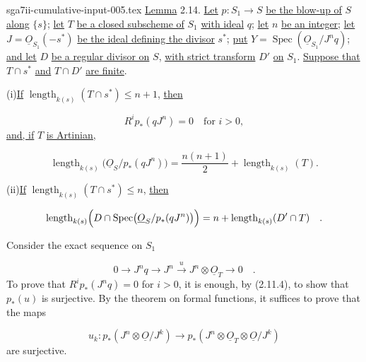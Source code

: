 \begin{filecontents*}{sga7ii-cumulative-input-005.tex}
\underline{Lemma} 2.14. \underline{Let} $p:S_1\longrightarrow S$
\underline{be the blow-up of} $S$ \underline{along} $\{s\}$; \underline{let}
$T$ \underline{be a closed subscheme of} $S_1$ \underline{with ideal} $q$;
\underline{let} $n$ \underline{be an integer}; \underline{let}
$J=\underline{O}_{S_1}(-s^*)$ \underline{be the ideal defining the divisor}
$s^*$; \underline{put}
$Y=\operatorname{Spec}(\underline{O}_{S_1}/J^nq)$; \underline{and let} $D$
\underline{be a regular divisor on} $S$, \underline{with strict transform} $D'$
\underline{on} $S_1$. \underline{Suppose that} $T\cap s^*$ \underline{and}
$T\cap D'$ \underline{are finite}.

(i)\quad \underline{If}
$\operatorname{length}_{k(s)}(T\cap s^*)\leq n+1$, \underline{then}

\begin{equation*}
R^ip_*(qJ^n)=0\quad\text{for }i>0,
\end{equation*}
\underline{and, if} $T$ \underline{is Artinian,}

\begin{equation*}
\operatorname{length}_{k(s)}
\bigl(\underline{O}_S/p_*(qJ^n)\bigr)
=\frac{n(n+1)}2+\operatorname{length}_{k(s)}(T).
\end{equation*}


(ii)\quad \underline{If}
$\operatorname{length}_{k(s)}(T\cap s^*)\leq n$, \underline{then}

\begin{equation*}
\operatorname{length}_{k(s)}
\Bigl(D\cap
\operatorname{Spec}\bigl(\underline{O}_S/p_*(qJ^n)\bigr)\Bigr)
=n+\operatorname{length}_{k(s)}(D'\cap T) \quad .
\end{equation*}

Consider the exact sequence on $S_1$

\begin{equation}\tag{2.14.1}
0\longrightarrow J^nq
\longrightarrow J^n
\xrightarrow{\,u\,}J^n\otimes\underline{O}_T
\longrightarrow0 \quad .
\end{equation}
To prove that $R^ip_*(J^nq)=0$ for $i>0$, it is enough, by (2.11.4), to show
that $p_*(u)$ is surjective.  By the theorem on formal functions, it suffices to
prove that the maps

\begin{equation*}
u_k:p_*(J^n\otimes\underline{O}/J^k)
\longrightarrow
p_*(J^n\otimes\underline{O}_T\otimes\underline{O}/J^k)
\end{equation*}
are surjective.


\end{filecontents*}
